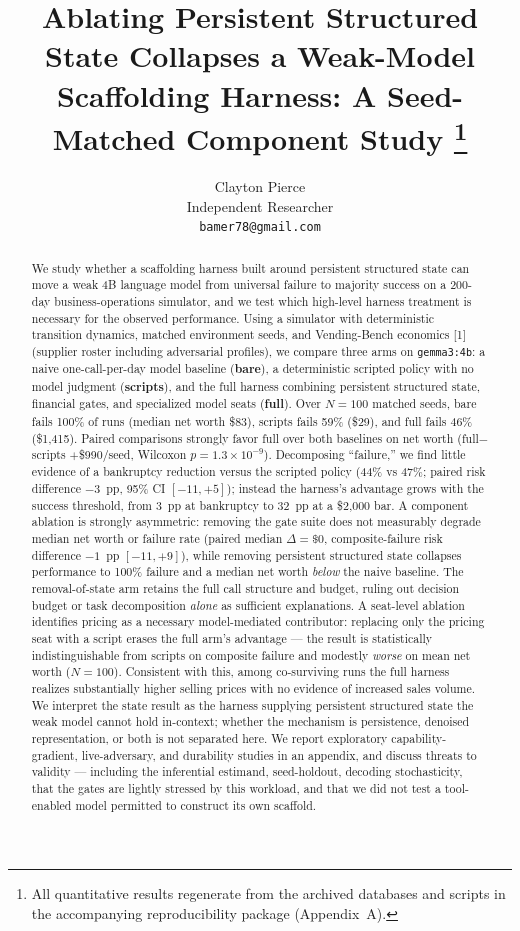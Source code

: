 \documentclass[11pt]{article}
\title{Ablating Persistent Structured State Collapses a Weak-Model
Scaffolding Harness: A Seed-Matched Component Study%
\thanks{All quantitative results regenerate from the archived databases and
scripts in the accompanying reproducibility package (Appendix~A).}}
\author{Clayton Pierce\\ Independent Researcher\\ \texttt{bamer78@gmail.com}}
\date{}
\begin{document}
\maketitle

\begin{abstract}
We study whether a scaffolding harness built around persistent structured
state can move a weak 4B language model from universal failure to majority
success on a 200-day business-operations simulator, and we test which
high-level harness treatment is necessary for the observed performance. Using a
simulator with deterministic transition dynamics, matched environment seeds,
and Vending-Bench economics [1] (supplier roster including adversarial
profiles), we compare three arms on \texttt{gemma3:4b}: a naive one-call-per-day
model baseline (\textbf{bare}), a deterministic scripted policy with no model
judgment (\textbf{scripts}), and the full harness combining persistent
structured state, financial gates, and specialized model seats
(\textbf{full}). Over $N=100$ matched seeds, bare fails 100\% of runs (median
net worth \$83), scripts fails 59\% (\$29), and full fails 46\% (\$1,415).
Paired comparisons strongly favor full over both baselines on net worth
(full$-$scripts $+$\$990/seed, Wilcoxon $p=1.3\times10^{-9}$). Decomposing
``failure,'' we find little evidence of a bankruptcy reduction versus the
scripted policy (44\% vs 47\%; paired risk difference $-3$~pp, 95\% CI
$[-11,+5]$); instead the harness's advantage grows with the success threshold,
from 3~pp at bankruptcy to 32~pp at a \$2,000 bar. A component ablation is
strongly asymmetric: removing the gate suite does not measurably degrade median
net worth or failure rate (paired median $\Delta=\$0$, composite-failure risk
difference $-1$~pp $[-11,+9]$), while removing persistent structured state
collapses performance to 100\% failure and a median net worth \emph{below} the
naive baseline. The removal-of-state arm retains the full call structure and
budget, ruling out decision budget or task decomposition \emph{alone} as
sufficient explanations. A seat-level ablation identifies pricing as a
necessary model-mediated contributor: replacing only the pricing seat with a
script erases the full arm's advantage --- the result is statistically
indistinguishable from scripts on composite failure and modestly \emph{worse}
on mean net worth ($N=100$). Consistent with this, among co-surviving runs the
full harness realizes substantially higher selling prices with no evidence of
increased sales volume. We interpret the state result as the harness supplying
persistent structured state the weak model cannot hold in-context; whether the
mechanism is persistence, denoised representation, or both is not separated
here. We report exploratory capability-gradient, live-adversary, and durability
studies in an appendix, and discuss threats to validity --- including the
inferential estimand, seed-holdout, decoding stochasticity, that the gates are
lightly stressed by this workload, and that we did not test a tool-enabled
model permitted to construct its own scaffold.
\end{abstract}
\end{document}
